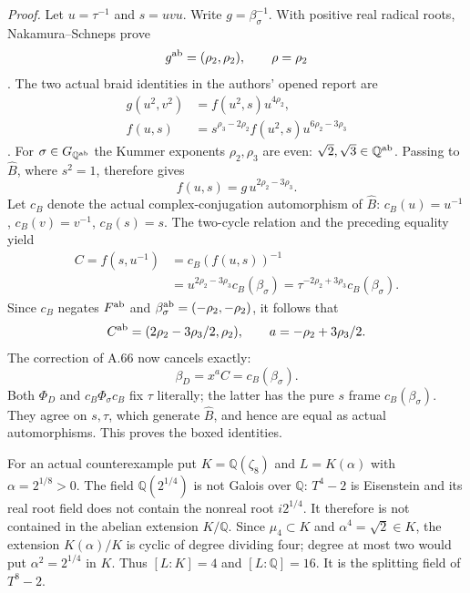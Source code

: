 \emph{Proof.}
Let $u=\tau^{-1}$ and $s=uvu$. Write $g=\beta_\sigma^{-1}$.
With positive real radical roots, Nakamura--Schneps prove
\[
 g^{\rm ab}=(\rho_2,\rho_2),\qquad \rho=\rho_2
\]
\cite[Proposition~2.4 and Definition~5.1]{LitNakamuraSchneps2000}.
The two actual braid identities in the authors' opened report are
\begin{align*}
 g(u^2,v^2)&=f(u^2,s)u^{4\rho_2},\\
 f(u,s)&=s^{\rho_3-2\rho_2}f(u^2,s)u^{6\rho_2-3\rho_3}
\end{align*}
\cite[Theorem~2, $(\mathrm{GF}_1)$; Theorem~1, $(\mathrm V)$]
{LitTsunogaiNakamura2002}.
For $\sigma\in G_{\mathbb Q^{\rm ab}}$ the Kummer exponents
$\rho_2,\rho_3$ are even: $\sqrt2,\sqrt3\in\mathbb Q^{\rm ab}$.
Passing to $\widehat B$, where $s^2=1$, therefore gives
\[
 f(u,s)=g\,u^{2\rho_2-3\rho_3}.
\]
Let $c_B$ denote the actual complex-conjugation automorphism of
$\widehat B$: $c_B(u)=u^{-1}$, $c_B(v)=v^{-1}$, $c_B(s)=s$.
The two-cycle relation and the preceding equality yield
\begin{align*}
 C=f(s,u^{-1})
   &=c_B(f(u,s))^{-1}\\
   &=u^{2\rho_2-3\rho_3}c_B(\beta_\sigma)
     =\tau^{-2\rho_2+3\rho_3}c_B(\beta_\sigma).
\end{align*}
Since $c_B$ negates $F^{\rm ab}$ and $\beta_\sigma^{\rm ab}
=(-\rho_2,-\rho_2)$, it follows that
\[
 C^{\rm ab}=(2\rho_2-3\rho_3/2,\rho_2),\qquad
 a=-\rho_2+3\rho_3/2.
\]
The correction of A.66 now cancels exactly:
\[
 \beta_D=x^aC=c_B(\beta_\sigma).
\]
Both $\Phi_D$ and $c_B\Phi_\sigma c_B$ fix $\tau$ literally;
the latter has the pure $s$ frame $c_B(\beta_\sigma)$.
They agree on $s,\tau$, which generate $\widehat B$, and hence are
equal as actual automorphisms. This proves the boxed identities.

For an actual counterexample put $K=\mathbb Q(\zeta_8)$ and
$L=K(\alpha)$ with $\alpha=2^{1/8}>0$. The field
$\mathbb Q(2^{1/4})$ is not Galois over $\mathbb Q$:
$T^4-2$ is Eisenstein and its real root field does not contain
the nonreal root $i2^{1/4}$. It therefore is not contained in
the abelian extension $K/\mathbb Q$. Since $\mu_4\subset K$
and $\alpha^4=\sqrt2\in K$, the extension $K(\alpha)/K$
is cyclic of degree dividing four; degree at most two would
put $\alpha^2=2^{1/4}$ in $K$. Thus $[L:K]=4$ and
$[L:\mathbb Q]=16$. It is the splitting field of $T^8-2$.

